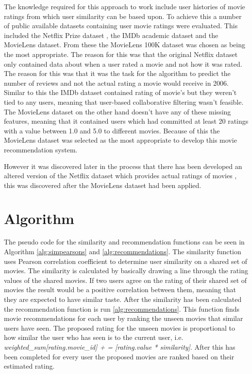 The knowledge required for this approach to work include user histories of movie ratings from which user similarity can be based upon. To achieve this a number of public available datasets containing user movie ratings were evaluated. This included the Netflix Prize dataset \cite{bennett0netflix} , the IMDb academic dataset \cite{IMDb2017} and the MovieLens \cite{Harper2015} dataset. From these the MovieLens 100K dataset was chosen as being the most appropriate. The reason for this was that the original Netflix dataset only contained data about when a user rated a movie and not how it was rated. The reason for this was that it was the task for the algorithm to predict the number of reviews and not the actual rating a movie would receive in 2006.  Similar to this the IMDb dataset contained rating of movie's but they weren't tied to any users, meaning that user-based collaborative filtering wasn't feasible. The MovieLens dataset on the other hand doesn't have any of these missing features, meaning that it contained users which had committed at least 20 ratings with a value between 1.0 and 5.0 to different movies. Because of this the MovieLens dataset was selected as the most appropriate to develop this movie recommendation system.

However it was discovered later in the process that there has been developed an altered version of the Netflix dataset which provides actual ratings of movies \cite{Netflix2009}, this was discovered after the MovieLens dataset had been applied.

\section{Algorithm}
	The pseudo code for the similarity and recommendation functions can be seen in Algorithm \ref{alg:simpearsons} and \ref{alg:recommendations}. The similarity function uses Pearson correlation coefficient to determine user similarity on a shared set of movies. The similarity is calculated by basically drawing a line through the rating values of the shared movies. If two users agree on the rating of their shared set of movies the result would be a positive correlation between them, meaning that they are expected to have similar taste. After the similarity has been calculated the recommendation function is run \ref{alg:recommendations}. This function finds movie recommendations for each user by ranking the unseen movies that similar users have seen. The proposed rating for the unseen movies is proportional to how similar the user who has seen is to the current user, i.e. \textit{weighted\_sum[rating.movie\_id] + = [rating.value * similarity]}. After this has been completed for every user the proposed movies are ranked based on their estimated rating.
	
